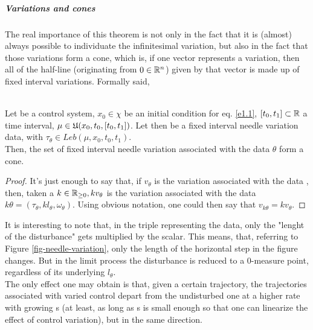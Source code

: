 \subparagraph[4.10]{Variations and cones} The real importance of this theorem is not only in the fact that it is (almost) always possible to individuate the infinitesimal variation, but also in the fact that those variations form a cone, which is, if one vector represents a variation, then all of the half-line (originating from $0\in\mathbb{R}^n$) given by that vector is made up of fixed interval variations. Formally said, \\\\

\begin{teo}
	Let \controlSystem\space be a control system, $x_0\in\chi$ be an initial condition for eq. \eqref{e1.1}, $[t_0,t_1]\subset\mathbb{R}$ a time interval, $\mu\in\mathfrak{U}(x_0,t_0,[t_0,t_1])$. Let then \fivData\space be a fixed interval needle variation data, with $\tau_\theta\in Leb(\mu,x_0,t_0,t_1)$.\\
Then, the set of fixed interval needle variation associated with the data $\theta$ form a cone.
	\label{4-10}
\end{teo}
\begin{proof}
	It's just enough to say that, if $v_\theta$ is the variation associated with the data \fivData, then, taken a $k\in\mathbb{R}_{\geq0}, kv_\theta$ is the variation associated with the data $k\theta=(\tau_\theta,kl_\theta,\omega_\theta)$. Using obvious notation, one could then say that $v_{k\theta}=kv_\theta$.
\end{proof}
It is interesting to note that, in the triple representing the data, only the "lenght of the disturbance" gets multiplied by the scalar. This means, that, referring to Figure \ref{fig-needle-variation}, only the length of the horizontal step in the figure changes. But in the limit process the disturbance is reduced to a 0-measure point, regardless of its underlying $l_\theta$.\\
The only effect one may obtain is that, given a certain trajectory, the trajectories associated with varied control depart from the undisturbed one at a higher rate with growing s (at least, as long as s is small enough so that one can linearize the effect of control variation), but in the same direction.

